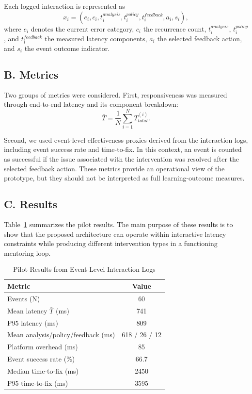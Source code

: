 \documentclass[conference]{IEEEtran}
\begin{document}
Each logged interaction is represented as
\[
x_i = (e_i, c_i, t^{analysis}_i, t^{policy}_i, t^{feedback}_i, a_i, s_i),
\]
where $e_i$ denotes the current error category, $c_i$ the recurrence count, $t^{analysis}_i$, $t^{policy}_i$, and $t^{feedback}_i$ the measured latency components, $a_i$ the selected feedback action, and $s_i$ the event outcome indicator.

\subsection*{B. Metrics}

Two groups of metrics were considered. First, responsiveness was measured through end-to-end latency and its component breakdown:
\[
\bar{T} = \frac{1}{N} \sum_{i=1}^{N} T_{total}^{(i)}.
\]

Second, we used event-level effectiveness proxies derived from the interaction logs, including event success rate and time-to-fix. In this context, an event is counted as successful if the issue associated with the intervention was resolved after the selected feedback action. These metrics provide an operational view of the prototype, but they should not be interpreted as full learning-outcome measures.

\subsection*{C. Results}

Table~\ref{tab:results} summarizes the pilot results. The main purpose of these results is to show that the proposed architecture can operate within interactive latency constraints while producing different intervention types in a functioning mentoring loop.

\begin{table}[t]
\centering
\caption{Pilot Results from Event-Level Interaction Logs}
\label{tab:results}
\renewcommand{\arraystretch}{1.15}
\begin{tabular}{lc}
\hline
\textbf{Metric} & \textbf{Value} \\
\hline
Events (N) & 60 \\
Mean latency $\bar{T}$ (ms) & 741 \\
P95 latency (ms) & 809 \\
Mean analysis/policy/feedback (ms) & 618 / 26 / 12 \\
Platform overhead (ms) & 85 \\
Event success rate (\%) & 66.7 \\
Median time-to-fix (ms) & 2450 \\
P95 time-to-fix (ms) & 3595 \\
\hline
\end{tabular}
\end{table}
\end{document}
